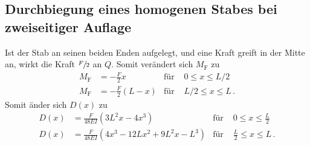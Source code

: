 \subsection{Durchbiegung eines homogenen Stabes bei zweiseitiger Auflage}
Ist der Stab an seinen beiden Enden aufgelegt, und eine Kraft greift in der Mitte an, wirkt die Kraft
$\sfrac{F}{2}$ an $Q$.
Somit verändert sich $M_\text{F}$ zu
\begin{align*}
    M_\text{F} & = - \frac{F}{2} x &\text{für} &\, \,0 \leq x \leq L/2 \\
    M_\text{F} & = - \frac{F}{2} (L -x) &\text{für} &\, \,L/2 \leq x \leq L \, .
\end{align*}
Somit änder sich $D(x)$ zu
\begin{align}
    D(x) & = \frac{F}{48EI}(3L^2x-4x^3) & \text{für} &\, \,0 \leq x \leq \frac{L}{2} \\
    D(x) & = \frac{F}{48EI}(4x^3- 12Lx^2+9L^2x-L^3) & \text{für} &\, \, \frac{L}{2} \leq x \leq L \, .
\end{align}